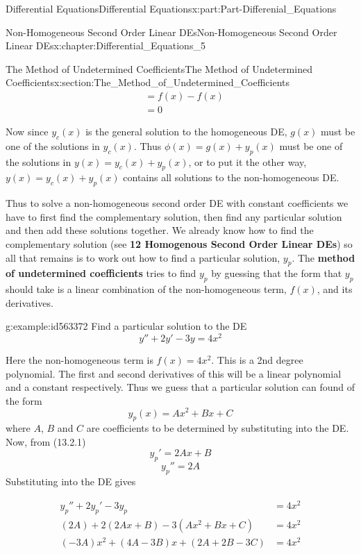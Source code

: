 \documentclass[oneside,10pt,]{book}
\newcommand{\terminology}[1]{\textbf{#1}}
\numberwithin{equation}{section}
\newcommand{\amp}{&}
\begin{document}
\begin{partptx}{Differential Equations}{}{Differential Equations}{}{}{x:part:Part-Differenial_Equations}
\begin{chapterptx}{Non-Homogeneous Second Order Linear DEs}{}{Non-Homogeneous Second Order Linear DEs}{}{}{x:chapter:Differential_Equations_5}
\begin{sectionptx}{The Method of Undetermined Coefficients}{}{The Method of Undetermined Coefficients}{}{}{x:section:The_Method_of_Undetermined_Coefficients}
\begin{align*}
\amp = f(x)-f(x)\\
\amp =0
\end{align*}
%
\par
Now since \(y_c(x)\) is the general solution to the homogeneous DE, \(g(x)\) must be one of the solutions in \(y_c(x)\). Thus \(\phi(x)=g(x)+y_p(x)\) must be one of the solutions in \(y(x)=y_c(x)+y_p(x)\), or to put it the other way, \(y(x)=y_c(x)+y_p(x)\) contains all solutions to the non-homogeneous DE.%
\par
Thus to solve a non-homogeneous second order DE with constant coefficients we have to first find the complementary solution, then find any particular solution and then add these solutions together. We already know how to find the complementary solution (see \terminology{12 Homogenous Second Order Linear DEs}) so all that remains is to work out how to find a particular solution, \(y_p\). The \terminology{method of undetermined coefficients} tries to find \(y_p\) by guessing that the form that \(y_p\) should take is a linear combination of the non-homogeneous term, \(f(x)\), and its derivatives.%
\begin{example}{}{g:example:id563372}%
Find a particular solution to the DE%
\begin{equation*}
y''+2y'-3y=4x^2
\end{equation*}
%
\par\smallskip%
\noindent\hypertarget{g:solution:id563391}{}Here the non-homogeneous term is \(f(x)=4x^2\). This is a 2nd degree polynomial. The first and second derivatives of this will be a linear polynomial and a constant respectively. Thus we guess that a particular solution can found of the form%
\begin{equation}
y_p(x)=Ax^2+Bx+C\label{g:men:id563377}
\end{equation}
where \(A\), \(B\) and \(C\) are coefficients to be determined by substituting into the DE. Now, from (13.2.1)%
\begin{equation*}
y_p'=2Ax+B
\end{equation*}
%
\begin{equation*}
y_p''=2A
\end{equation*}
Substituting into the DE gives%
\par
%
\begin{align*}
y_p''+2y_p'-3y_p \amp = 4x^2\\
(2A)+2(2Ax+B)-3(Ax^2+Bx+C)\amp = 4x^2\\
(-3A)x^2+(4A-3B)x+(2A+2B-3C)\amp = 4x^2
\end{align*}

\end{example}
\end{sectionptx}
\end{chapterptx}
\end{partptx}
\end{document}
